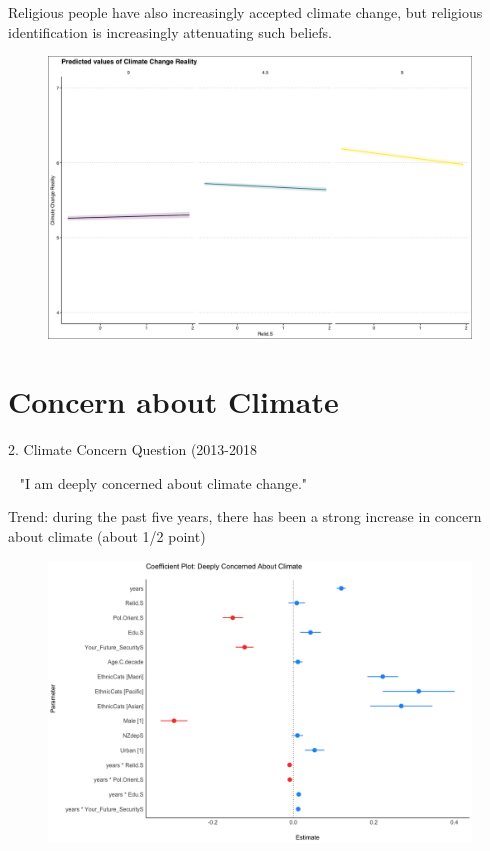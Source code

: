 \documentclass{beamer}
\begin{document}
\begin{frame}{Religious people have also increasingly accepted climate change, but religious identification is increasingly attenuating such beliefs.}
\begin{figure}
\includegraphics[width=.8\textwidth,height=\textheight,keepaspectratio]{Figures/REAL_RELIDS_T.png}
\end{figure}
\end{frame}


\section{Concern about Climate}
\begin{frame}{2. Climate Concern Question (2013-2018}
    

\begin{alertblock}{~}
"I am deeply concerned about climate change."
\end{alertblock}

\end{frame}


\begin{frame}{Trend: during the past five years, there has been a strong increase in concern about climate (about 1/2 point)}
\begin{figure}
\includegraphics[width=.8\textwidth,height=\textheight,keepaspectratio]{Figures/CONCERN_TIME.png}
\end{figure}
\end{frame}
\end{document}
